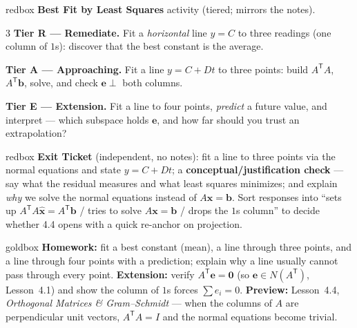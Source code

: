 \documentclass[10pt]{article}
\newcommand{\xx}{\mathbf{x}}
\newcommand{\bb}{\mathbf{b}}
\newcommand{\ee}{\mathbf{e}}
\newcommand{\zero}{\mathbf{0}}
\newcommand{\T}{\mathsf{T}}
\begin{document}
\begin{skillbox}{redbox}
\textbf{Best Fit by Least Squares} activity (tiered; mirrors the notes).
\begin{multicols}{3}
\textbf{Tier R --- Remediate.} Fit a \emph{horizontal} line $y=C$ to three readings (one column of $1$s):
discover that the best constant is the average.

\columnbreak
\textbf{Tier A --- Approaching.} Fit a line $y=C+Dt$ to three points: build $A^{\T}A$, $A^{\T}\bb$, solve,
and check $\ee\perp$ both columns.

\columnbreak
\textbf{Tier E --- Extension.} Fit a line to four points, \emph{predict} a future value, and interpret ---
which subspace holds $\ee$, and how far should you trust an extrapolation?
\end{multicols}
\end{skillbox}

\begin{skillbox}{redbox}
\textbf{Exit Ticket} (independent, no notes): fit a line to three points via the normal equations and state
$y=C+Dt$; a \textbf{conceptual/justification check} --- say what the residual measures and what least
squares minimizes; and explain \emph{why} we solve the normal equations instead of $A\xx=\bb$. Sort
responses into ``sets up $A^{\T}A\hat{\xx}=A^{\T}\bb$ / tries to solve $A\xx=\bb$ / drops the $1$s column''
to decide whether 4.4 opens with a quick re-anchor on projection.
\end{skillbox}

\begin{skillbox}{goldbox}
\textbf{Homework:} fit a best constant (mean), a line through three points, and a line through four points
with a prediction; explain why a line usually cannot pass through every point. \textbf{Extension:} verify
$A^{\T}\ee=\zero$ (so $\ee\in N(A^{\T})$, Lesson~4.1) and show the column of $1$s forces $\sum e_i=0$.
\textbf{Preview:} Lesson~4.4, \emph{Orthogonal Matrices \& Gram--Schmidt} --- when the columns of $A$ are
perpendicular unit vectors, $A^{\T}A=I$ and the normal equations become trivial.
\end{skillbox}
\end{document}
